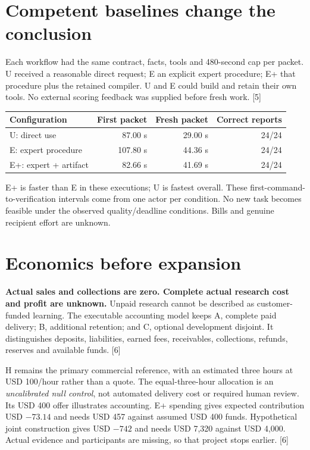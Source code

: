 \documentclass[10pt]{article}
\begin{document}
\section*{Competent baselines change the conclusion}
Each workflow had the same contract, facts, tools and 480-second cap per packet. U received a reasonable direct request; E an explicit expert procedure; E+ that procedure plus the retained compiler. U and E could build and retain their own tools. No external scoring feedback was supplied before fresh work. [5]

\begin{center}
\begin{tabular}{@{}lrrr@{}}
\toprule
Configuration & First packet & Fresh packet & Correct reports\\\midrule
U: direct use & 87.00 s & 29.00 s & 24/24\\
E: expert procedure & 107.80 s & 44.36 s & 24/24\\
E+: expert + artifact & 82.66 s & 41.69 s & 24/24\\
\bottomrule
\end{tabular}
\end{center}
E+ is faster than E in these executions; U is fastest overall. These first-command-to-verification intervals come from one actor per condition. No new task becomes feasible under the observed quality/deadline conditions. Bills and genuine recipient effort are unknown.

\newpage
\section*{Economics before expansion}
\textbf{Actual sales and collections are zero. Complete actual research cost and profit are unknown.} Unpaid research cannot be described as customer-funded learning. The executable accounting model keeps A, complete paid delivery; B, additional retention; and C, optional development disjoint. It distinguishes deposits, liabilities, earned fees, receivables, collections, refunds, reserves and available funds. [6]

H remains the primary commercial reference, with an estimated three hours at USD 100/hour rather than a quote. The equal-three-hour allocation is an \emph{uncalibrated null control}, not automated delivery cost or required human review. Its USD 400 offer illustrates accounting. E+ spending gives expected contribution USD $-73.14$ and needs USD 457 against assumed USD 400 funds. Hypothetical joint construction gives USD $-742$ and needs USD 7,320 against USD 4,000. Actual evidence and participants are missing, so that project stops earlier. [6]
\end{document}
